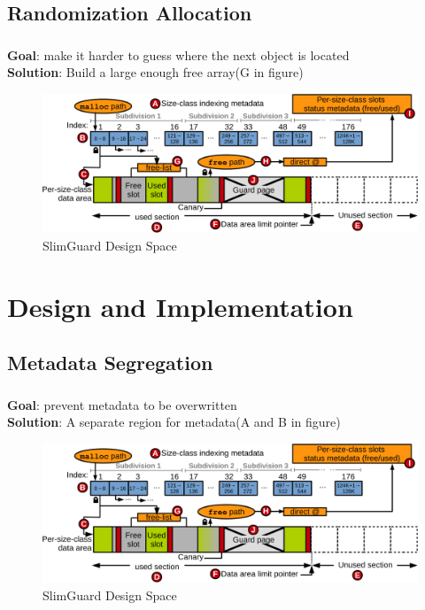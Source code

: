 \documentclass{beamer}
\begin{document}
\subsection{Randomization Allocation}
\begin{frame}
    \frametitle{\secname}
    \framesubtitle{\subsecname}
    \textbf{Goal}: make it harder to guess where the next object is located \\
    \textbf{Solution}: Build a large enough free array(G in figure)
    \begin{figure}
      \centering
      \includegraphics[scale=0.35]{overview3.pdf}
      \\ SlimGuard Design Space
    \end{figure}
\end{frame}

\section{Design and Implementation}
\subsection{Metadata Segregation}
\begin{frame}
    \frametitle{\secname}
    \framesubtitle{\subsecname}
    \textbf{Goal}: prevent metadata to be overwritten \\
    \textbf{Solution}: A separate region for metadata(A and B in figure)
    \begin{figure}
      \centering
      \includegraphics[scale=0.35]{overview3.pdf}
      \\ SlimGuard Design Space
    \end{figure}
\end{frame}
\end{document}
